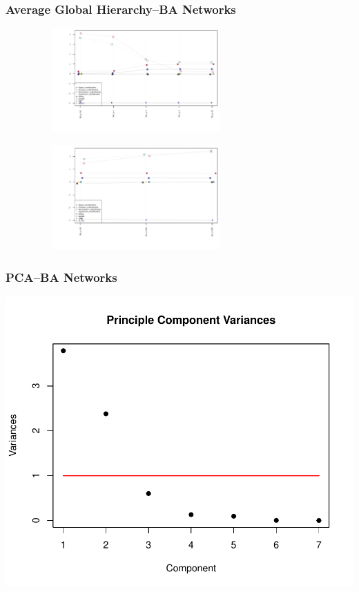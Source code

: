 \documentclass[xcolor={table}]{beamer}
\newenvironment{changemargin}[2]{%
  \begin{list}{}{%
    \setlength{\topsep}{0pt}%
    \setlength{\leftmargin}{#1}%
    \setlength{\rightmargin}{#2}%
    \setlength{\listparindent}{\parindent}%
    \setlength{\itemindent}{\parindent}%
    \setlength{\parsep}{\parskip}%
  }%
  \item[]}{\end{list}}
\begin{document}
\begin{frame}\frametitle{Average Global Hierarchy--BA Networks}
	\begin{changemargin}{-2cm}{ -2cm}
		\centering
		 \par
		 \includegraphics[width=10cm, height=4cm]{images/BA_Param_Averages.pdf}
		\\
		\vspace{-5mm}
		 \par
		\includegraphics[width=10cm, height=4cm]{images/BA_Size_Averages.pdf}
	\end{changemargin}
\end{frame}


\begin{frame}\frametitle{PCA--BA Networks}
	\begin{changemargin}{-2cm}{ -2cm}
		\centering
		\includegraphics[scale = 0.6]{images/BA_Param_PCA_Component_Varinces.pdf}
	\end{changemargin}
\end{frame}
\end{document}
